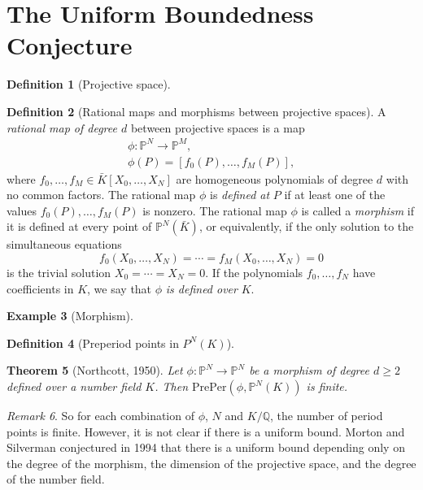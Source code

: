 \documentclass{amsart}
\theoremstyle{plain}
\newtheorem{theorem}{Theorem}[section]
\theoremstyle{definition}
\newtheorem{definition}[theorem]{Definition}
\newtheorem{example}[theorem]{Example}
\theoremstyle{remark}
\newtheorem{remark}[theorem]{Remark}
\renewcommand{\P}{\mathbb{P}}
\newcommand{\Q}{\mathbb{Q}}
\newcommand{\preper}{\mathrm{PrePer}}
\begin{document}
\section{The Uniform Boundedness Conjecture}

\begin{definition}[Projective space]
\end{definition}

\begin{definition}[Rational maps and morphisms between projective spaces]
  A \emph{rational map of degree $d$} between projective spaces is a
  map
  \[
  \begin{gathered}
    \phi: \P^N \to \P^M,\\
    \phi(P) = [f_0(P), \dots, f_M(P)],
  \end{gathered}
  \]
  where $f_0, \dots, f_M \in \bar{K}[X_0, \dots, X_N]$ are homogeneous
  polynomials of degree $d$ with no common factors. The rational map
  $\phi$ is \emph{defined at} $P$ if at least one of the values
  $f_0(P), \dots, f_M(P)$ is nonzero. The rational map $\phi$ is
  called a \emph{morphism} if it is defined at every point of
  $\P^N(\bar{K})$, or equivalently, if the only solution to the
  simultaneous equations
  \[
  f_0(X_0, \dots, X_N) = \cdots = f_M(X_0, \dots, X_N) = 0
  \]
  is the trivial solution $X_0 = \cdots = X_N = 0$. If the polynomials
  $f_0, \dots, f_N$ have coefficients in $K$, we say that $\phi$
  \emph{is defined over} $K$.
\end{definition}

\begin{example}[Morphism]
\end{example}

\begin{definition}[Preperiod points in $P^N(K)$]
\end{definition}

\begin{theorem}[Northcott, 1950]
  Let $\phi: \P^N \to \P^N$ be a morphism of degree $d \ge 2$ defined
  over a number field $K$. Then $\preper(\phi, \P^N(K))$ is finite.
\end{theorem}

\begin{remark}
  So for each combination of $\phi$, $N$ and $K/\Q$, the number of
  period points is finite. However, it is not clear if there is a
  uniform bound. Morton and Silverman conjectured in 1994 that there
  is a uniform bound depending only on the degree of the morphism, the
  dimension of the projective space, and the degree of the number
  field.
\end{remark}
\end{document}

